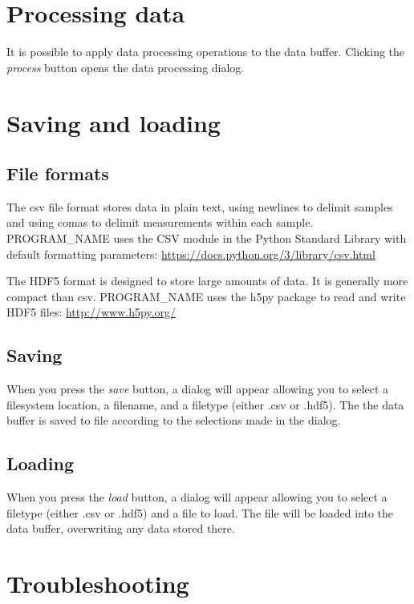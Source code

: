 \documentclass[11pt,letterpaper,article,oneside]{memoir}
\newcommand{\name}{PROGRAM\_NAME}
\begin{document}
\section{Processing data}

It is possible to apply data processing operations to the data buffer. Clicking
the \emph{process} button opens the data processing dialog.


\section{Saving and loading}
\label{sec:savingloading}

\subsection{File formats}

\label{sec:fileformats}
The csv file format stores data in plain text, using newlines to delimit samples 
and using comas to delimit measurements within each sample.
\name{} uses the CSV module in the Python Standard Library
with default formatting parameters:
\url{https://docs.python.org/3/library/csv.html}

The HDF5 format is designed to store large amounts of data. It is generally more
compact than csv. \name{} uses the h5py package to read and write HDF5 files:
\url{http://www.h5py.org/}


\subsection{Saving}

When you press the \emph{save} button, a dialog will appear allowing you to
select a filesystem location, a filename, and a filetype (either .csv or .hdf5).
The the data buffer is saved to file according to the selections made in the
dialog.

\subsection{Loading}

When you press the \emph{load} button, a dialog will appear allowing you to
select a filetype (either .csv or .hdf5) and a file to load. The file will be
loaded into the data buffer, overwriting any data stored there.

\section{Troubleshooting}
\end{document}
